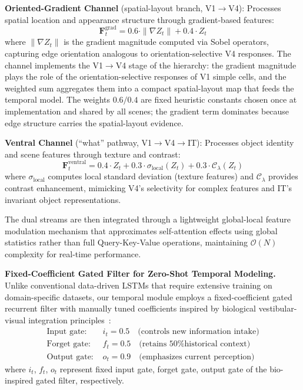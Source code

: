\textbf{Oriented-Gradient Channel} (spatial-layout branch, V1$\rightarrow$V4): Processes spatial location and appearance structure through gradient-based features:
\begin{equation}
    \mathbf{F}^{\text{grad}}_t = 0.6 \cdot \|\nabla Z_t\| + 0.4 \cdot Z_t
\end{equation}
where $\|\nabla Z_t\|$ is the gradient magnitude computed via Sobel operators, capturing edge orientation analogous to orientation-selective V4 responses. The channel implements the V1$\rightarrow$V4 stage of the hierarchy: the gradient magnitude plays the role of the orientation-selective responses of V1 simple cells, and the weighted sum aggregates them into a compact spatial-layout map that feeds the temporal model. The weights $0.6/0.4$ are fixed heuristic constants chosen once at implementation and shared by all scenes; the gradient term dominates because edge structure carries the spatial-layout evidence.

\textbf{Ventral Channel} (``what'' pathway, V1$\rightarrow$V4$\rightarrow$IT): Processes object identity and scene features through texture and contrast:
\begin{equation}
    \mathbf{F}^{\text{ventral}}_t = 0.4 \cdot Z_t + 0.3 \cdot \sigma_{\text{local}}(Z_t) + 0.3 \cdot \mathcal{C}_\lambda(Z_t)
\end{equation}
where $\sigma_{\text{local}}$ computes local standard deviation (texture features) and $\mathcal{C}_\lambda$ provides contrast enhancement, mimicking V4's selectivity for complex features and IT's invariant object representations.

The dual streams are then integrated through a lightweight global-local feature modulation mechanism that approximates self-attention effects using global statistics rather than full Query-Key-Value operations, maintaining $\mathcal{O}(N)$ complexity for real-time per\-for\-mance.

\textbf{Fixed-Coefficient Gated Filter for Zero-Shot Temporal Modeling.}
Unlike conventional data-driven LSTMs that require extensive training on do\-main-spe\-cif\-ic datasets, our temporal module employs a fixed-coefficient gated recurrent filter with manually tuned coefficients inspired by biological ves\-tib\-u\-lar-visual integration principles~\cite{Angelaki2004, Cullen2012}:
\begin{align}
    \text{Input gate: }  & i_t = 0.5 \quad \text{(controls new information intake)} \\
    \text{Forget gate: } & f_t = 0.5 \quad \text{(retains 50\% historical context)} \\
    \text{Output gate: } & o_t = 0.9 \quad \text{(emphasizes current perception)}
\end{align}
where $i_t$, $f_t$, $o_t$ represent fixed input gate, forget gate, output gate of the bio-inspired gated filter, respectively.


